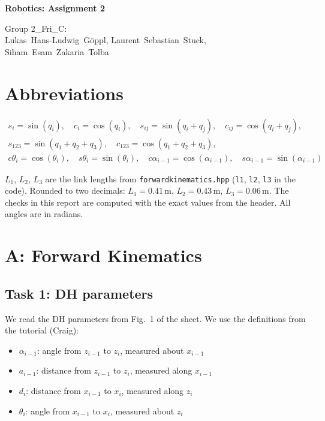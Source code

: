 \documentclass[11pt, a4paper]{article}
\begin{document}
{\Large \textbf{Robotics: Assignment 2}}

Group 2\_Fri\_C: \\
Lukas~Hans-Ludwig~Göppl, Laurent~Sebastian~Stuck, Siham~Esam~Zakaria~Tolba

\section*{Abbreviations}

\begin{gather*}
  s_i = \sin(q_i), \quad c_i = \cos(q_i), \quad
  s_{ij} = \sin(q_i + q_j), \quad c_{ij} = \cos(q_i + q_j), \\
  s_{123} = \sin(q_1 + q_2 + q_3), \quad c_{123} = \cos(q_1 + q_2 + q_3), \\
  c\theta_i = \cos(\theta_i), \quad s\theta_i = \sin(\theta_i), \quad
  c\alpha_{i-1} = \cos(\alpha_{i-1}), \quad s\alpha_{i-1} = \sin(\alpha_{i-1})
\end{gather*}

$L_1$, $L_2$, $L_3$ are the link lengths from \texttt{forwardkinematics.hpp}
(\texttt{l1}, \texttt{l2}, \texttt{l3} in the code). Rounded to two decimals:
$L_1 = 0.41$\,m, $L_2 = 0.43$\,m, $L_3 = 0.06$\,m. The checks in this report are computed with the
exact values from the header. All angles are in radians.

\section*{A: Forward Kinematics}

\subsection*{Task 1: DH parameters}

We read the DH parameters from Fig.~1 of the sheet. We use the definitions from the tutorial (Craig):

\begin{itemize}
  \item $\alpha_{i-1}$: angle from $z_{i-1}$ to $z_i$, measured about $x_{i-1}$
  \item $a_{i-1}$: distance from $z_{i-1}$ to $z_i$, measured along $x_{i-1}$
  \item $d_i$: distance from $x_{i-1}$ to $x_i$, measured along $z_i$
  \item $\theta_i$: angle from $x_{i-1}$ to $x_i$, measured about $z_i$
\end{itemize}
\end{document}
